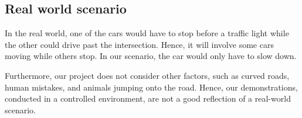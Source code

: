 \subsection{Real world scenario}
 In the real world, one of the cars would have to stop before a traffic light while the other could drive past the intersection. Hence, it will involve some cars moving while others stop. In our scenario, the car would only have to slow down.

Furthermore, our project does not consider other factors, such as curved roads, human mistakes, and animals jumping onto the road. Hence, our demonstrations, conducted in a controlled environment, are not a good reflection of a real-world scenario.